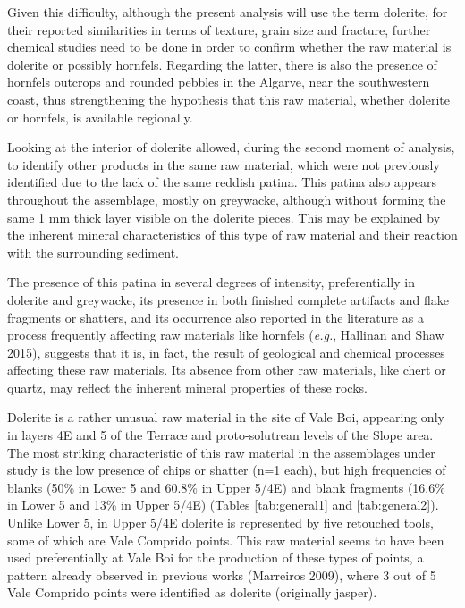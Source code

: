 \documentclass[12pt,twoside]{reedthesis}
\begin{document}
Given this difficulty, although the present analysis will use the term dolerite, for their reported similarities in terms of texture, grain size and fracture, further chemical studies need to be done in order to confirm whether the raw material is dolerite or possibly hornfels. Regarding the latter, there is also the presence of hornfels outcrops and rounded pebbles in the Algarve, near the southwestern coast, thus strengthening the hypothesis that this raw material, whether dolerite or hornfels, is available regionally.

Looking at the interior of dolerite allowed, during the second moment of analysis, to identify other products in the same raw material, which were not previously identified due to the lack of the same reddish patina. This patina also appears throughout the assemblage, mostly on greywacke, although without forming the same 1 mm thick layer visible on the dolerite pieces. This may be explained by the inherent mineral characteristics of this type of raw material and their reaction with the surrounding sediment.

The presence of this patina in several degrees of intensity, preferentially in dolerite and greywacke, its presence in both finished complete artifacts and flake fragments or shatters, and its occurrence also reported in the literature as a process frequently affecting raw materials like hornfels (\emph{e.g.}, Hallinan and Shaw 2015), suggests that it is, in fact, the result of geological and chemical processes affecting these raw materials. Its absence from other raw materials, like chert or quartz, may reflect the inherent mineral properties of these rocks.

Dolerite is a rather unusual raw material in the site of Vale Boi, appearing only in layers 4E and 5 of the Terrace and proto-solutrean levels of the Slope area. The most striking characteristic of this raw material in the assemblages under study is the low presence of chips or shatter (n=1 each), but high frequencies of blanks (50\% in Lower 5 and 60.8\% in Upper 5/4E) and blank fragments (16.6\% in Lower 5 and 13\% in Upper 5/4E) (Tables \ref{tab:general1} and \ref{tab:general2}). Unlike Lower 5, in Upper 5/4E dolerite is represented by five retouched tools, some of which are Vale Comprido points. This raw material seems to have been used preferentially at Vale Boi for the production of these types of points, a pattern already observed in previous works (Marreiros 2009), where 3 out of 5 Vale Comprido points were identified as dolerite (originally jasper).
\end{document}
